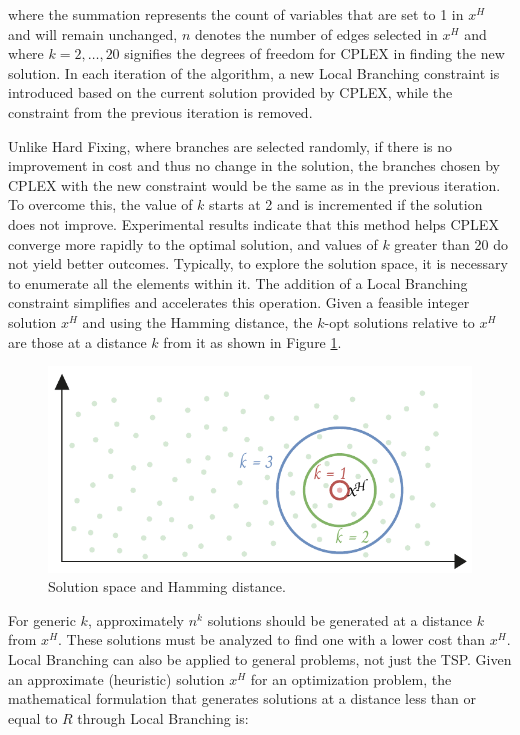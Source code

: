 where the summation represents the count of variables that are set to 1 in \(x^H\) and will remain unchanged, \(n\) denotes the number of edges selected in \(x^H\) and where \(k = 2, \ldots, 20\) signifies the degrees of freedom for CPLEX in finding the new solution. In each iteration of the algorithm, a new Local Branching constraint is introduced based on the current solution provided by CPLEX, while the constraint from the previous iteration is removed.

Unlike Hard Fixing, where branches are selected randomly, if there is no improvement in cost and thus no change in the solution, the branches chosen by CPLEX with the new constraint would be the same as in the previous iteration. To overcome this, the value of \(k\) starts at 2 and is incremented if the solution does not improve.
Experimental results indicate that this method helps CPLEX converge more rapidly to the optimal solution, and values of \(k\) greater than 20 do not yield better outcomes. Typically, to explore the solution space, it is necessary to enumerate all the elements within it. The addition of a Local Branching constraint simplifies and accelerates this operation.
Given a feasible integer solution \(x^H\) and using the Hamming distance, the \(k\)-opt solutions relative to \(x^H\) are those at a distance \(k\) from it as shown in Figure \ref{fig:soft_fix}.

\begin{figure}[H]
    \centering
    \includegraphics[width=0.8\linewidth]{Immagini/soft_fix.pdf}
    \caption{Solution space and Hamming distance.}
    \label{fig:soft_fix}
\end{figure}

For generic \(k\), approximately \(n^k\) solutions should be generated at a distance \(k\) from \(x^H\). These solutions must be analyzed to find one with a lower cost than \(x^H\).
Local Branching can also be applied to general problems, not just the TSP. Given an approximate (heuristic) solution \(x^H\) for an optimization problem, the mathematical formulation that generates solutions at a distance less than or equal to \(R\) through Local Branching is:

